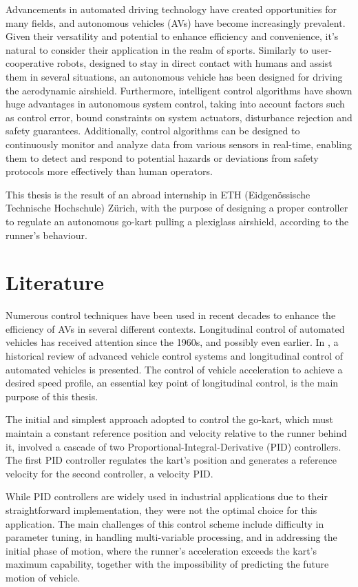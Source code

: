 \documentclass[a4paper,12pt,oneside]{book}
\begin{document}
Advancements in automated driving technology have created opportunities for many fields, and autonomous vehicles (AVs) have become increasingly prevalent. 
Given their versatility and potential to enhance efficiency and convenience, it's natural to consider their application in the realm of sports. 
Similarly to user-cooperative robots, designed to stay in direct contact with humans and assist them in several situations, an autonomous vehicle has been designed for driving the aerodynamic airshield. 
Furthermore, intelligent control algorithms have shown huge advantages in autonomous system control, taking into account factors such as control error, bound constraints on system actuators, disturbance rejection and safety guarantees. 
Additionally, control algorithms can be designed to continuously monitor and analyze data from various sensors in real-time, enabling them to detect and respond to potential hazards or deviations from safety protocols more effectively than human operators.
\bigskip

This thesis is the result of an abroad internship in ETH (Eidgen\"ossische Technische Hochschule) Z\"urich, with the purpose of designing a proper controller to regulate an autonomous go-kart pulling a plexiglass airshield, according to the runner's behaviour.

		
\section*{Literature}
Numerous control techniques have been used in recent decades to enhance the efficiency of AVs in several different contexts.
Longitudinal control of automated vehicles has received attention since the 1960s, and possibly even earlier.
In \cite{Review_AVCS}, a historical review of advanced vehicle control systems and longitudinal control of automated vehicles is presented.
The control of vehicle acceleration to achieve a desired speed profile, an essential key point of longitudinal control, is the main purpose of this thesis.

\bigskip
The initial and simplest approach adopted to control the go-kart, which must maintain a constant reference position and velocity relative to the runner behind it, involved a cascade of two Proportional-Integral-Derivative (PID) controllers.
The first PID controller regulates the kart's position and generates a reference velocity for the second controller, a velocity PID.

While PID controllers are widely used in industrial applications due to their straightforward implementation, they were not the optimal choice for this application.
The main challenges of this control scheme include difficulty in parameter tuning, in handling multi-variable processing, and in addressing the initial phase of motion, where the runner's acceleration exceeds the kart's maximum capability, together with the impossibility of predicting the future motion of vehicle. 
\end{document}
